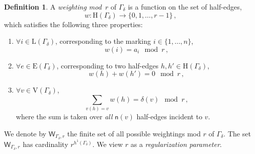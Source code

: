 \documentclass[a4paper,12pt]{article} %
\def\E{\mathrm{E}}
\def\L{\mathrm{L}}
\def\V{\mathrm{V}}
\def\H{\mathrm{H}}
\theoremstyle{definition}
\newtheorem{definition}{Definition} %
\theoremstyle{plain}%
\begin{document}
\begin{definition} A {\em weighting mod~$r$} of $\Gamma_\delta$ is a function on the set of half-edges,
$$ w:\H(\Gamma_\delta) \rightarrow \{0,1, \ldots, r-1\}\, ,$$
which satisfies the following three properties:

\begin{enumerate}
\item[(i)] $\forall i\in \L(\Gamma_\delta)$, corresponding to
 the marking $i\in \{1,\ldots, n\}$,
$$w(i)=a_i  \mod r\, ,$$
\item[(ii)] $\forall e \in \E(\Gamma_\delta)$, corresponding to two half-edges
$h,h' \in \H(\Gamma_\delta)$,
$$w(h)+w(h')=0 \mod r\, ,$$
\item[(iii)] $\forall v\in \V(\Gamma_\delta)$,
$$\sum_{v(h)= v} w(h)= \delta(v) \mod r\, ,$$ 
where the sum is taken over {\em all} $\mathsf{n}(v)$ half-edges incident 
to $v$.\end{enumerate}
\end{definition}



We denote by $\mathsf{W}_{\Gamma_\delta,r}$ the finite set of all possible weightings
mod $r$
of
$\Gamma_\delta$. The set $\mathsf{W}_{\Gamma_\delta,r}$ has cardinality $r^{h^1(\Gamma_\delta)}$.
We view $r$ as a {\em regularization parameter}.
\end{document}
